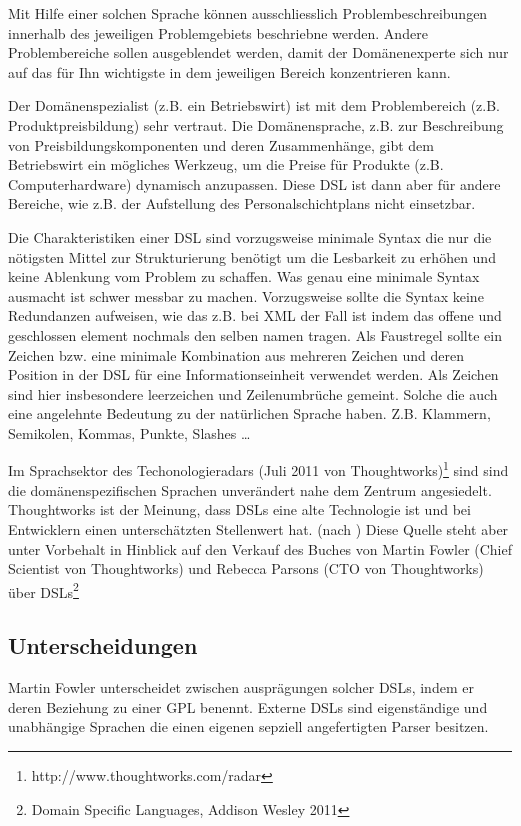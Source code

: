 \documentclass[11pt,english,ngerman, headsepline]{scrreprt}
\begin{document}
Mit Hilfe einer solchen Sprache können ausschliesslich Problembeschreibungen
innerhalb des jeweiligen Problemgebiets beschriebne werden.
Andere Problembereiche sollen ausgeblendet werden, damit der Domänenexperte sich
nur auf das für Ihn wichtigste in dem jeweiligen Bereich konzentrieren kann.

Der Domänenspezialist (z.B. ein Betriebswirt) ist mit dem Problembereich (z.B.
Produktpreisbildung) sehr vertraut. Die Domänensprache, z.B. zur Beschreibung
von Preisbildungskomponenten und deren Zusammenhänge, gibt dem Betriebswirt ein
mögliches Werkzeug, um die Preise für Produkte (z.B. Computerhardware) dynamisch
anzupassen. Diese DSL ist dann aber für andere Bereiche, wie z.B.
der Aufstellung des Personalschichtplans nicht einsetzbar.

Die Charakteristiken einer DSL sind vorzugsweise minimale Syntax die nur die
nötigsten Mittel zur Strukturierung benötigt um die Lesbarkeit zu erhöhen und
keine Ablenkung vom Problem zu schaffen. 
Was genau eine minimale Syntax ausmacht ist schwer messbar zu machen.
Vorzugsweise sollte die Syntax keine Redundanzen aufweisen, wie das z.B. bei
XML der Fall ist indem das offene und geschlossen element nochmals den selben
namen tragen. Als Faustregel sollte ein Zeichen bzw. eine minimale Kombination
aus mehreren Zeichen und deren Position in der DSL für eine Informationseinheit
verwendet werden. Als Zeichen sind hier insbesondere leerzeichen und
Zeilenumbrüche gemeint. Solche die auch eine angelehnte Bedeutung zu der
natürlichen Sprache haben. Z.B. Klammern, Semikolen, Kommas, Punkte, Slashes \ldots 

Im Sprachsektor des Techonologieradars (Juli 2011 von
Thoughtworks)\footnote{http://www.thoughtworks.com/radar}
sind sind die domänenspezifischen Sprachen unverändert nahe dem Zentrum
angesiedelt. Thoughtworks ist der Meinung, dass DSLs eine alte Technologie ist
und bei Entwicklern einen unterschätzten Stellenwert
hat. (nach \cite{thoughtworks-tr}) Diese Quelle steht aber unter Vorbehalt in
Hinblick auf den Verkauf des Buches von Martin Fowler (Chief Scientist von
Thoughtworks) und Rebecca Parsons (CTO von Thoughtworks) über DSLs\footnote{Domain Specific
Languages, Addison Wesley 2011} 


\subsection{Unterscheidungen}

Martin Fowler unterscheidet zwischen ausprägungen solcher DSLs, indem er deren
Beziehung zu einer GPL benennt. Externe DSLs sind eigenständige und unabhängige
Sprachen die einen eigenen sepziell angefertigten Parser besitzen. 
\end{document}
